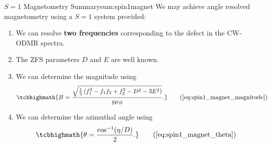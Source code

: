 \begin{summary}{$S=1$ Magnetometry Summary}{sum:spin1magnet}
	We may achieve angle resolved magnetometry using a $S=1$ system provided:
	\begin{enumerate}
        \item We can resolve \textbf{two frequencies} corresponding to the defect in the CW-ODMR spectra.
		\item The ZFS parameters $D$ and $E$ are well known.
		\item We can determine the magnitude using
		      \begin{equation}
			      \tcbhighmath{B = \frac{\sqrt{\frac{1}{3} \left(f_1^2 - f_1 f_2 + f_2^2 -D^2 -3E^2\right)}}{g \mu_B}.}
			      \tag{\ref{eq:spin1_magnet_magnitude}}
		      \end{equation}
		\item We can determine the azimuthal angle using
		      \begin{equation}
			      \tcbhighmath{
				      \theta = \frac{\cos^{-1} (\eta/D)}{2}.
			      }
			      \tag{\ref{eq:spin1_magnet_theta}}
		      \end{equation}
	\end{enumerate}
\end{summary}
